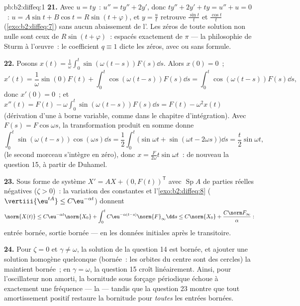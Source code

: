 \begin{solution}{pb:b2:diffeq:1}
\textbf{21.} Avec $u = ty$~: $u'' = ty'' + 2y'$, donc $ty'' + 2y'
+ ty = u'' + u = 0$~: $u = A\sin t + B\cos t = R\sin(t +
\varphi)$, et $y = \frac{u}{t}$ retrouve $\frac{\sin t}t$ et
$\frac{\cos t}t$ (\cref{exo:b2:diffeq:7}) sans aucun abaissement de
l'. Les zéros de toute solution non nulle sont ceux de
$R\sin(t + \varphi)$~: espacés exactement de $\pi$ --- la
philosophie de Sturm à l'œuvre~: le coefficient $q \equiv 1$ dicte
les zéros, avec ou sans formule.

\textbf{22.} Posons $x(t) =
\frac1\omega\int_0^t\sin(\omega(t-s))F(s)\dd s$. Alors $x(0) =
0$~;
\[
x'(t) = \frac1\omega\sin(0)F(t) +
\int_0^t\cos(\omega(t-s))F(s)\dd s
= \int_0^t\cos(\omega(t-s))F(s)\dd s ,
\]
donc $x'(0) = 0$~; et $x''(t) = F(t) -
\omega\int_0^t\sin(\omega(t-s))F(s)\dd s = F(t) - \omega^2x(t)$
(dérivation d'une  à borne variable, comme
dans le chapitre d'intégration). Avec $F(s) = F\cos\omega s$, la
transformation produit en somme donne
\[
\int_0^t\sin(\omega(t-s))\cos(\omega s)\dd s
= \frac12\int_0^t\bigl(\sin\omega t + \sin(\omega t -
2\omega s)\bigr)\dd s
= \frac{t}{2}\sin\omega t ,
\]
(le second morceau s'intègre en zéro), donc $x =
\frac{F}{2\omega}t\sin\omega t$~: de nouveau la question 15, à
partir de Duhamel.

\textbf{23.} Sous forme de système $X' = AX + (0, F(t))^{\mathsf T}$
avec $\operatorname{Sp}A$ de parties réelles négatives ($\zeta >
0$)~: la variation des constantes et l'\cref{exo:b2:diffeq:8}
($\vertiii{\eu^{tA}} \leq C\eu^{-\alpha t}$) donnent
\[
\norm{X(t)} \leq C\eu^{-\alpha t}\norm{X_0}
+ \int_0^t C\eu^{-\alpha(t-s)}\norm{F}_\infty\dd s
\leq C\norm{X_0} + \frac{C\norm F_\infty}{\alpha} :
\]
entrée bornée, sortie bornée ---  en les données
initiales après le transitoire.

\textbf{24.} Pour $\zeta = 0$ et $\gamma \neq \omega$,
la solution de la question 14 est bornée, et ajouter une solution
homogène quelconque (bornée~: les orbites du centre sont des
cercles) la maintient bornée~; en $\gamma = \omega$, la question 15
croît linéairement. Ainsi, pour l'oscillateur non amorti, la
bornitude sous forçage périodique échoue à exactement une
fréquence --- la  --- tandis que la question 23 montre que
tout amortissement positif restaure la bornitude pour \emph{toutes}
les entrées bornées.


\end{solution}
